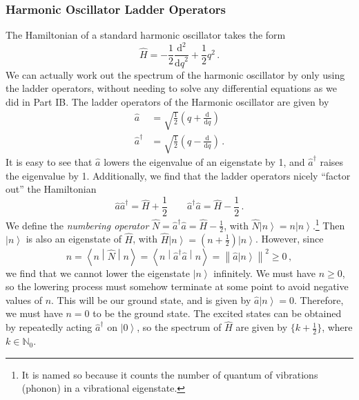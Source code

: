 \documentclass{article}
\theoremstyle{plain}\theoremheaderfont{\normalfont\itshape}\theorembodyfont{\rmfamily}\theoremseparator{.}\newtheorem*{rem}{Remark}\newtheorem*{ex}{Example}\newtheorem*{proof}{Proof}\newtheorem*{altp}{Alternative proof}
\theoremstyle{plain}\theoremheaderfont{\normalfont\bfseries}\theorembodyfont{\rmfamily}\theoremseparator{.}\newtheorem{thm}{Theorem}[section]\newtheorem{lem}[thm]{Lemma}\newtheorem{prop}[thm]{Proposition}\newtheorem*{cor}{Corollary}\newtheorem{defn}[thm]{Definition}\newtheorem{clm}[thm]{Claim}\newtheorem{clminproof}{Claim}
\theoremstyle{break}\theoremheaderfont{\normalfont\itshape}\theorembodyfont{\rmfamily}\theoremseparator{.\medskip}\newtheorem*{proofskip}{Proof}\newtheorem*{exs}{Examples}\newtheorem*{rems}{Remarks}
\theoremstyle{break}\theoremheaderfont{\normalfont\bfseries}\theorembodyfont{\rmfamily}\theoremseparator{.\medskip}\newtheorem{lemskip}[thm]{Lemma}\newtheorem{defnskip}[thm]{Definition}\newtheorem{propskip}[thm]{Proposition}\newtheorem{thmskip}[thm]{Theorem}
\numberwithin{equation}{section}
\newcommand{\dv}[3][]{\frac{\mathrm{d}^{#1} #2}{{\mathrm{d} #3}^{#1}}}
\newcommand{\ket}[1]{\left| #1 \right\rangle}
\newcommand{\mel}[3]{\left\langle #1 \middle| #2 \middle| #3 \right\rangle}
\newcommand{\vb}[1]{\bm{\mathrm{#1}}}
\newcommand{\norm}[1]{\left\| #1 \right\|}
\newcommand{\NN}{\mathbb{N}}
\begin{document}
    \subsubsection{Harmonic Oscillator Ladder Operators}
    The Hamiltonian of a standard harmonic oscillator takes the form
    \begin{equation}
        \hat{H}=-\frac{1}{2}\dv[2]{}{q}+\frac{1}{2}q^2\,.
    \end{equation}
    We can actually work out the spectrum of the harmonic oscillator by only using the ladder operators, without needing to solve any differential equations as we did in Part IB. The ladder operators of the Harmonic oscillator are given by
    \begin{align}
        \hat{a}&=\sqrt{\frac{1}{2}}\left(q+\dv{}{q}\right)\\
        \hat{a}^\dagger&=\sqrt{\frac{1}{2}}\left(q-\dv{}{q}\right)\,.
    \end{align}
    It is easy to see that \(\hat{a}\) lowers the eigenvalue of an eigenstate by 1, and \(\hat{a}^\dagger\) raises the eigenvalue by 1. Additionally, we find that the ladder operators nicely ``factor out'' the Hamiltonian
    \begin{equation}
        \hat{a}\hat{a}^\dagger=\hat{H}+\frac{1}{2} \qquad \hat{a}^\dagger\hat{a}=\hat{H}-\frac{1}{2}\,.
    \end{equation}
    We define the \textit{numbering operator} \(\hat{N}=\hat{a}^\dagger\hat{a}=\hat{H}-\frac{1}{2}\), with \(\hat{N}\ket{n}=n\ket{n}\).\footnote{It is named so because it counts the number of quantum of vibrations (phonon) in a vibrational eigenstate.} Then \(\ket{n}\) is also an eigenstate of \(\hat{H}\), with \(\hat{H}\ket{n}=(n+\frac{1}{2})\ket{n}\). However, since
    \begin{equation}
        n=\mel{n}{\hat{N}}{n}=\mel{n}{\hat{a}^\dagger\hat{a}}{n}=\norm{\hat{a}\ket{n}}^2\ge 0\,,
    \end{equation}
    we find that we cannot lower the eigenstate \(\ket{n}\) infinitely. We must have \(n\ge 0\), so the lowering process must somehow terminate at some point to avoid negative values of \(n\). This will be our ground state, and is given by \(\hat{a}\ket{n}=\vb{0}\). Therefore, we must have \(n=0\) to be the ground state. The excited states can be obtained by repeatedly acting \(\hat{a}^\dagger\) on \(\ket{0}\), so the spectrum of \(\hat{H}\) are given by \(\{k+\frac{1}{2}\}\), where \(k\in\NN_0\).
\end{document}

